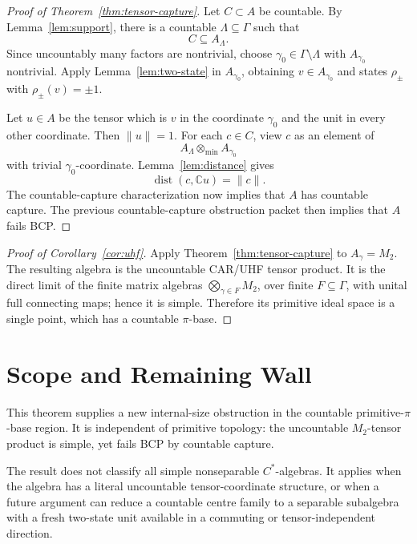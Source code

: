 \documentclass[11pt]{article}
\newcommand{\C}{\mathbb C}
\newcommand{\dist}{\operatorname{dist}}
\newcommand{\otmin}{\otimes_{\min}}
\begin{document}
\begin{proof}[Proof of Theorem~\ref{thm:tensor-capture}]
Let \(C\subset A\) be countable.  By Lemma~\ref{lem:support}, there is a
countable \(\Lambda\subseteq\Gamma\) such that
\[
        C\subseteq A_\Lambda.
\]
Since uncountably many factors are nontrivial, choose
\(\gamma_0\in\Gamma\setminus\Lambda\) with \(A_{\gamma_0}\) nontrivial.
Apply Lemma~\ref{lem:two-state} in \(A_{\gamma_0}\), obtaining
\(v\in A_{\gamma_0}\) and states \(\rho_\pm\) with \(\rho_\pm(v)=\pm1\).

Let \(u\in A\) be the tensor which is \(v\) in the coordinate \(\gamma_0\)
and the unit in every other coordinate.  Then \(\|u\|=1\).  For each
\(c\in C\), view \(c\) as an element of
\[
        A_\Lambda\otmin A_{\gamma_0}
\]
with trivial \(\gamma_0\)-coordinate.  Lemma~\ref{lem:distance} gives
\[
        \dist(c,\C u)=\|c\|.
\]
The countable-capture characterization now implies that \(A\) has countable
capture.  The previous countable-capture obstruction packet then implies
that \(A\) fails BCP.
\end{proof}

\begin{proof}[Proof of Corollary~\ref{cor:uhf}]
Apply Theorem~\ref{thm:tensor-capture} to \(A_\gamma=M_2\).  The resulting
algebra is the uncountable CAR/UHF tensor product.  It is the direct limit of
the finite matrix algebras \(\bigotimes_{\gamma\in F}M_2\), over finite
\(F\subseteq\Gamma\), with unital full connecting maps; hence it is simple.
Therefore its primitive ideal space is a single point, which has a countable
\(\pi\)-base.
\end{proof}

\section*{Scope and Remaining Wall}

This theorem supplies a new internal-size obstruction in the countable
primitive-\(\pi\)-base region.  It is independent of primitive topology:
the uncountable \(M_2\)-tensor product is simple, yet fails BCP by countable
capture.

The result does not classify all simple nonseparable \(C^*\)-algebras.  It
applies when the algebra has a literal uncountable tensor-coordinate
structure, or when a future argument can reduce a countable centre family to
a separable subalgebra with a fresh two-state unit available in a commuting
or tensor-independent direction.
\end{document}
